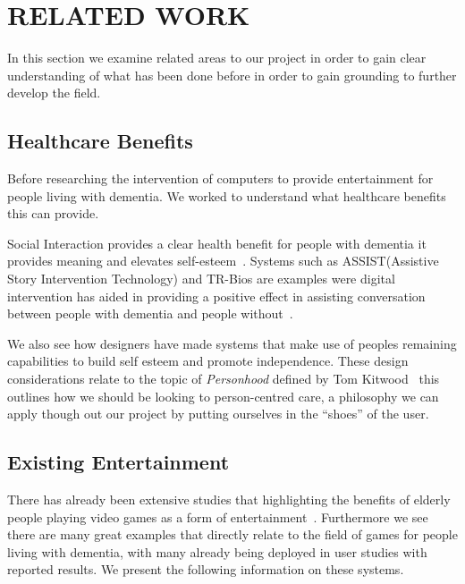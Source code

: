 \chapter{RELATED WORK}\label{lit}
In this section we examine related areas to our project in order to gain clear understanding of what has been done before in order to gain grounding to further develop the field.

\section{Healthcare Benefits}
Before researching the intervention of computers to provide entertainment for people living with dementia. We worked to understand what healthcare benefits this can provide.

Social Interaction provides a clear health benefit for people with dementia it provides meaning and elevates self-esteem~\cite{vernooij2007}.
Systems such as ASSIST(Assistive Story Intervention Technology) and TR-Bios are examples were digital intervention has aided in providing a positive effect in assisting conversation between people with dementia and people without~\cite{Dijkstra2004263, cohen2000two}.

We also see how designers have made systems that make use of peoples remaining capabilities to build self esteem and promote independence\cite{VanRijn2010, Sterns2005}. These design considerations relate to the topic of \emph{Personhood} defined by Tom Kitwood~\cite{personhood} this outlines how we should be looking to person-centred care, a philosophy we can apply though out our project by putting ourselves in the ``shoes'' of the user.

\section{Existing Entertainment}
There has already been extensive studies that highlighting the benefits of elderly people playing video games as a form of entertainment~\cite{gamberini2008}. Furthermore we see there are many great examples that directly relate to the field of games for people living with dementia, with many already being deployed in user studies with reported results. We present the following information on these systems.

